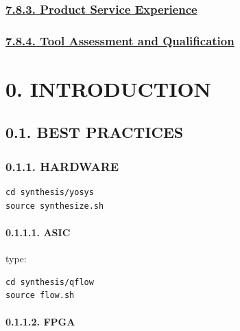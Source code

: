 \documentclass[
]{article}
\begin{document}
\hypertarget{product-service-experience}{%
\subsubsection{\texorpdfstring{\protect\hyperlink{product-service-experience-1}{7.8.3.
Product Service
Experience}}{7.8.3. Product Service Experience}}\label{product-service-experience}}

\hypertarget{tool-assessment-and-qualification}{%
\subsubsection{\texorpdfstring{\protect\hyperlink{tool-assessment-and-qualification-1}{7.8.4.
Tool Assessment and
Qualification}}{7.8.4. Tool Assessment and Qualification}}\label{tool-assessment-and-qualification}}

\hypertarget{introduction-1}{%
\section{0. INTRODUCTION}\label{introduction-1}}

\hypertarget{best-practices-1}{%
\subsection{0.1. BEST PRACTICES}\label{best-practices-1}}

\hypertarget{hardware-1}{%
\subsubsection{0.1.1. HARDWARE}\label{hardware-1}}

\begin{verbatim}
cd synthesis/yosys
source synthesize.sh
\end{verbatim}

\hypertarget{asic-1}{%
\paragraph{0.1.1.1. ASIC}\label{asic-1}}

type:

\begin{verbatim}
cd synthesis/qflow
source flow.sh
\end{verbatim}

\hypertarget{fpga-1}{%
\paragraph{0.1.1.2. FPGA}\label{fpga-1}}
\end{document}
